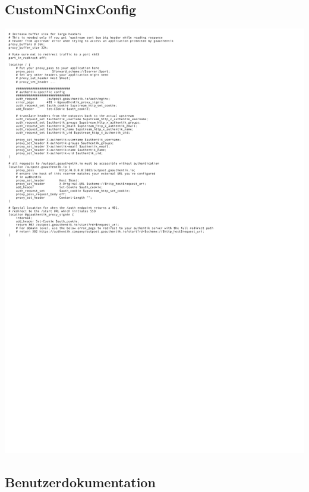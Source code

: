 \subsection{CustomNGinxConfig}
\label{app:CustomNGinxConfig}
\includegraphics{Anhang/Custom_NGinx_Configuration.pdf}

\subsection{Benutzerdokumentation}
\label{app:Benutzerdokumentation}
\clearpage